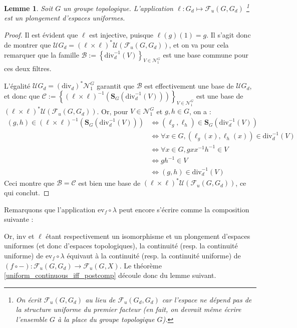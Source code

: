 \documentclass[a4paper,12pt]{article}
\newtheorem{lemma}[theorem]{Lemme}
\newcommand{\ev}{\mathrm{ev}}
\newcommand{\set}[1]{\left\{ #1 \right\}}
\newcommand{\inv}{^{-1}}
\newcommand{\comp}{\circ}
\newcommand{\nhds}{\mathcal{N}}
\renewcommand{\iff}{\Leftrightarrow}
\newcommand{\blank}{{-}}
\newcommand{\invop}{\mathrm{inv}}
\newcommand{\divop}{\mathrm{div}}
\begin{document}
\begin{lemma}
    Soit $G$ un groupe topologique. L'application $\ell : G_d\mapsto\mathcal{F}_u(G, G_d)$
    \footnote{On écrit $\mathcal{F}_u(G, G_d)$ au lieu de $\mathcal{F}_u(G_d, G_d)$ car l'espace
    ne dépend pas de la structure uniforme du premier facteur (en fait, on devrait même écrire l'ensemble $G$ 
    à la place du groupe topologique $G$).} est un plongement d'espaces uniformes.
\end{lemma}

\begin{proof}
    Il est évident que $\ell$ est injective, puisque $\ell(g)(1)=g$. Il s'agit
    donc de montrer que $\mathcal{U}G_d = (\ell\times\ell)^*\mathcal{U}(\mathcal{F}_u(G, G_d))$,
    et on va pour cela remarquer que la famille $\mathcal{B}:=\set{\divop_d\inv(V)}_{V\in\nhds_1^G}$ est une base commune pour ces deux filtres.

    L'égalité $\mathcal{U}G_d=(\divop_d)^*\nhds_1^G$ garantit que $\mathcal{B}$ est effectivement une base de $\mathcal{U}G_d$,
    et donc que $\mathcal{C}:=\set{(\ell\times\ell)\inv\left(\mathbf{S}_G(\divop_d\inv(V))\right)}_{V\in\nhds_1^G}$ est une base de $(\ell\times\ell)^*\mathcal{U}(\mathcal{F}_u(G, G_d))$.
    Or, pour $V\in\nhds_1^G$ et $g, h\in G$, on a :
    \begin{align*}
        (g, h)\in(\ell\times\ell)\inv\left(\mathbf{S}_G(\divop_d\inv(V))\right) 
            &\iff (\ell_g,\ell_h)\in \mathbf{S}_G(\divop_d\inv(V)) \\
            &\iff \forall x\in G, (\ell_g(x),\ell_h(x))\in\divop_d\inv(V) \\
            &\iff \forall x\in G, g x x\inv h\inv \in V \\
            &\iff g h\inv \in V \\
            &\iff (g, h) \in\divop_d\inv(V)
    \end{align*}
    Ceci montre que $\mathcal{B}=\mathcal{C}$ est bien une base de $(\ell\times\ell)^*\mathcal{U}(\mathcal{F}_u(G, G_d))$, ce qui conclut.
\end{proof}

Remarquons que l'application $\ev_f\comp\lambda$ peut encore s'écrire comme la composition suivante :
\begin{center}
\end{center}
Or, $\invop$ et $\ell$ étant respectivement un isomorphisme et un plongement d'espaces uniformes (et donc d'espaces topologiques), 
la continuité (resp. la continuité uniforme) de $\ev_f\comp\lambda$ équivaut à la continuité (resp. la continuité uniforme) de 
$(f\comp\blank):\mathcal{F}_u(G, G_d)\to\mathcal{F}_u(G, X)$. Le théorème \ref{uniform_continuous_iff_postcomp} découle donc 
du lemme suivant. 
\end{document}
